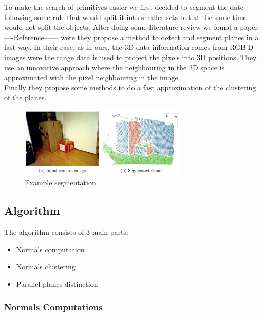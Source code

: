 \documentclass[fontsize=12pt]{article}
\begin{document}
To make the search of primitives easier we first decided to segment the date following some rule that would split it into smaller sets but at the same time would not split the objects. After doing some literature review we found a paper ----Reference------ were they propose a method to detect and segment planes in a fast way. In their case, as in ours, the 3D data information comes from RGB-D images were the range data is used to project the pixels into 3D positions. They use an innovative approach where the neighbouring in the 3D space is approximated with the pixel neighbouring in the image.\\

Finally they propose some methods to do a fast approximation of the clustering of the planes.\\

\begin{figure}[!htbp]
  \begin{center}
    \includegraphics[width=8cm]{./images/segmentation_result.png}
    \caption{Example segmentation}
    \label{fig:example_segmentation}
  \end{center}
\end{figure}

\subsection{Algorithm}
\label{sub:plane_algorithm}

The algorithm consists of 3 main parts:

\begin{itemize}
  \item Normals computation
  \item Normals clustering
  \item Parallel planes distinction
\end{itemize}




\subsubsection{Normals Computations}
\end{document}
